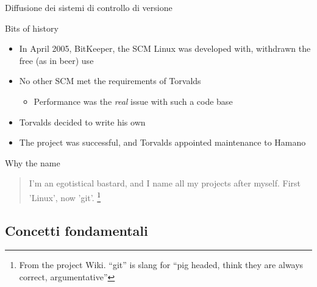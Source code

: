 \documentclass[xcolor=dvipsnames,presentation]{beamer}
\begin{document}
\begin{frame}[allowframebreaks]{Diffusione dei sistemi di controllo di versione}
\begin{center}
    \end{center}
\end{frame}

\begin{frame}[fragile]{Bits of history}
    \begin{itemize}
        \item In April 2005, BitKeeper, the SCM Linux was developed with, withdrawn the free (as in
beer) use
        \item No other SCM met the requirements of Torvalds
        \begin{itemize}
            \item Performance was the \textit{real} issue with such a code base
        \end{itemize}
        \item Torvalds decided to write his own
        \item The project was successful, and Torvalds appointed maintenance to Hamano
    \end{itemize}
    \begin{block}{Why the name}
        \begin{quote}
            I'm an egotistical bastard, and I name all my projects after myself. First 'Linux', now
'git'. \footnote{\tiny{From the project Wiki. ``git'' is slang for ``pig headed, think they are
always correct, argumentative''}}
            \begin{flushright}
            \end{flushright}
        \end{quote}
    \end{block}
\end{frame}

\subsection{Concetti fondamentali}
\end{document}
